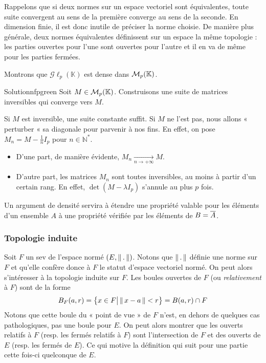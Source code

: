     Rappelons que si deux normes sur un espace vectoriel sont équivalentes, toute suite convergent au sens de la première converge au sens de la seconde. En dimension finie, il est donc inutile de préciser la norme choisie. De manière plus générale, deux normes équivalentes définissent sur un espace la même topologie : les parties ouvertes pour l’une sont ouvertes pour l’autre et il en va de même pour les parties fermées.

    \begin{exo}{}{}
        Montrons que $\mathcal{G}\ell_p(\mathbb{K})$ est dense dans $\mathcal{M}_{p}(\mathbb{K})$.
    \end{exo}

    \begin{demo}{Solution}{nfpgreen}
        Soit $M \in \mathcal{M}_{p}(\mathbb{K})$. Construisons une suite de matrices inversibles qui converge vers $M$.
         
        Si $M$ est inversible, une suite constante suffit. Si $M$ ne l’est pas, nous allons « perturber « sa diagonale pour parvenir à nos fins. En effet, on pose $M_n = M - \frac{1}{n} I_p$ pour $n \in \mathbb{N}^*$.
        \begin{itemize}
            \item D’une part, de manière évidente, $M_n \underset{n \rightarrow + \infty}{\longrightarrow} M$.
            \item D’autre part, les matrices $M_n$ sont toutes inversibles, au moins à partir d’un certain rang. En effet, $\det(M-\lambda I_p)$ s’annule au plus $p$ fois.
        \end{itemize}
    \end{demo}

    Un argument de densité servira à étendre une propriété valable pour les éléments d’un ensemble $A$ à une propriété vérifiée par les éléments de $B = \overline{A}$.

    \subsubsection{Topologie induite}

    Soit $F$ un sev de l’espace normé $(E, \left\lVert\,.\,\right\rVert)$. Notons que $\left\lVert\,.\,\right\rVert$ définie une norme sur $F$ et qu’elle confère donce à $F$ le statut d’espace vectoriel normé. On peut alors s’intéresser à la topologie induite sur $F$. Les boules ouvertes de $F$ (ou \textit{relativement} à $F$) sont de la forme 
    \[ B_F(a,r) = \big\{ x \in F \big| \left\lVert\,x - a\,\right\rVert < r \big\} = B(a,r) \cap F \] 
    Notons que cette boule du « point de vue » de $F$ n’est, en dehors de quelques cas pathologiques, pas une boule pour $E$. On peut alors montrer que les ouverts relatifs à $F$ (resp. les fermés relatifs à $F$) sont l’intersection de $F$ et des ouverts de $E$ (resp. les fermés de $E$). Ce qui motive la définition qui suit pour une partie cette fois-ci quelconque de $E$.

